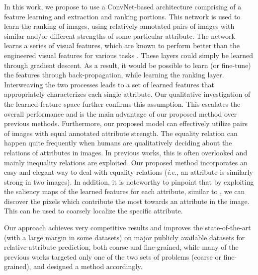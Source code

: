 \documentclass[runningheads]{llncs}
\newcommand{\ie}{\textit{i}.\textit{e}.}
\begin{document}
In this work, we propose to use a ConvNet-based architecture comprising of a feature learning and extraction and ranking portions. This network is used to learn the ranking of images, using relatively annotated pairs of images with similar and/or different strengths of some particular attribute. The network learns a series of visual features, which are known %
 to perform better than the engineered visual features for various tasks \cite{offtheshelf}. These layers could simply be learned through gradient descent. As a result, it would be possible to learn (or fine-tune) the features through back-propagation, while learning the ranking layer.
Interweaving the two processes leads to a set of learned features that appropriately characterizes each single attribute. Our qualitative investigation of the learned feature space further confirms this assumption. This escalates the overall performance and is the main advantage of our proposed method over previous methods. 
Furthermore, our proposed model can effectively utilize pairs of images with equal annotated attribute strength. The equality relation can happen quite frequently when humans are qualitatively deciding about the relations of attributes in images. In previous works, this is often overlooked and mainly inequality relations are exploited. Our proposed method incorporates an easy and elegant way to deal with equality relations (\ie, an attribute is similarly strong in two images). 
In addition, it is noteworthy to pinpoint that by exploiting the saliency maps of the learned features for each attribute, similar to \cite{saliency}, we can discover the pixels which contribute the most towards an attribute in the image. This can be used to coarsely localize the specific attribute.

Our approach achieves very competitive results and improves the state-of-the-art (with a large margin in some datasets) on major publicly available datasets for relative attribute prediction, both coarse and fine-grained, while many of the previous works targeted only one of the two sets of problems (coarse or fine-grained), and designed a method accordingly.
\end{document}
